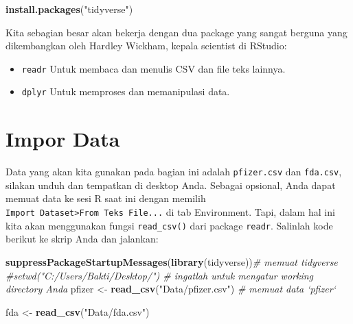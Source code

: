 \documentclass[
]{book}
\newenvironment{Shaded}{\begin{snugshade}}{\end{snugshade}}
\newcommand{\CommentTok}[1]{\textcolor[rgb]{0.56,0.35,0.01}{\textit{#1}}}
\newcommand{\KeywordTok}[1]{\textcolor[rgb]{0.13,0.29,0.53}{\textbf{#1}}}
\newcommand{\NormalTok}[1]{#1}
\newcommand{\StringTok}[1]{\textcolor[rgb]{0.31,0.60,0.02}{#1}}
\providecommand{\tightlist}{%
  \setlength{\itemsep}{0pt}\setlength{\parskip}{0pt}}
\begin{document}
\begin{Shaded}
\begin{Highlighting}[]
\KeywordTok{install.packages}\NormalTok{(}\StringTok{"tidyverse"}\NormalTok{)}
\end{Highlighting}
\end{Shaded}

Kita sebagian besar akan bekerja dengan dua package yang sangat berguna yang dikembangkan oleh Hardley Wickham, kepala scientist di RStudio:

\begin{itemize}
\tightlist
\item
  \texttt{readr} Untuk membaca dan menulis CSV dan file teks lainnya.
\item
  \texttt{dplyr} Untuk memproses dan memanipulasi data.
\end{itemize}

\hypertarget{impor-data}{%
\section{Impor Data}\label{impor-data}}

Data yang akan kita gunakan pada bagian ini adalah \texttt{pfizer.csv} dan \texttt{fda.csv}, silakan unduh dan tempatkan di desktop Anda. Sebagai opsional, Anda dapat memuat data ke sesi R saat ini dengan memilih \texttt{Import\ Dataset\textgreater{}From\ Teks\ File...} di tab Environment. Tapi, dalam hal ini kita akan menggunakan fungsi \texttt{read\_csv()} dari package \texttt{readr}. Salinlah kode berikut ke skrip Anda dan jalankan:

\begin{Shaded}
\begin{Highlighting}[]
\KeywordTok{suppressPackageStartupMessages}\NormalTok{(}\KeywordTok{library}\NormalTok{(tidyverse))}\CommentTok{# memuat tidyverse}
\CommentTok{#setwd("C:/Users/Bakti/Desktop/")                 # ingatlah untuk mengatur working directory Anda}
\NormalTok{pfizer <-}\StringTok{ }\KeywordTok{read_csv}\NormalTok{(}\StringTok{"Data/pfizer.csv"}\NormalTok{)             }\CommentTok{# memuat data `pfizer` }
\end{Highlighting}
\end{Shaded}

\begin{Shaded}
\begin{Highlighting}[]
\NormalTok{fda <-}\StringTok{ }\KeywordTok{read_csv}\NormalTok{(}\StringTok{"Data/fda.csv"}\NormalTok{)}
\end{Highlighting}
\end{Shaded}
\end{document}
